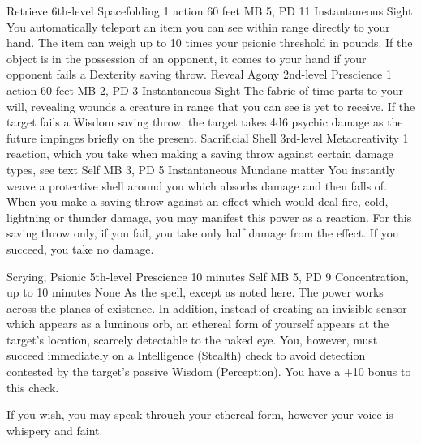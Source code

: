 \DndPowerHeader%
    {Retrieve\label{pwr:retrieve}}
    {6th-level Spacefolding}
    {1 action}
    {60 feet}
    {MB 5, PD 11}
    {Instantaneous}
    {Sight}
You automatically teleport an item you can
see within range directly to your hand. The item can weigh
up to 10 times your psionic threshold in pounds. If the object
is in the possession of an opponent, it comes to your hand
if your opponent fails a Dexterity saving throw.
\DndPowerHeader%
    {Reveal Agony\label{pwr:reveal_agony}}
    {2nd-level Prescience}
    {1 action}
    {60 feet}
    {MB 2, PD 3}
    {Instantaneous}
    {Sight}
The fabric of time parts to your will, revealing
wounds a creature in range that you can see
is yet to receive. If the target
fails a Wisdom saving throw, the target takes 4d6 psychic
damage as the future impinges briefly on the present.
\DndPowerHeader%
    {Sacrificial Shell\label{pwr:sacrificial_shell}}
    {3rd-level Metacreativity}
    {1 reaction, which you take when making a saving throw against certain damage types, see text}
    {Self}
    {MB 3, PD 5}
    {Instantaneous}
    {Mundane matter}
You instantly weave a protective shell around
you which absorbs damage and then falls of. When you make
a saving throw against an effect which would deal fire, cold,
lightning or thunder damage, you may manifest this power as
a reaction. For this saving throw only, if you fail, you take
only half damage from the effect. If you succeed, you take
no damage.

\DndPowerHeader%
    {Scrying, Psionic\label{pwr:scrying_psionic}}
    {5th-level Prescience}
    {10 minutes}
    {Self}
    {MB 5, PD 9}
    {Concentration, up to 10 minutes}
    {None}
As the  spell, except as noted
here. The power works across the planes of existence. In addition,
instead of creating an invisible sensor which appears as a
luminous orb, an ethereal form of yourself appears at the
target's location, scarcely detectable to the naked eye.
You, however, must succeed immediately on a Intelligence (Stealth)
check to avoid detection contested by the target's passive
Wisdom (Perception). You have a +10 bonus to this check.

If you wish, you may speak through your ethereal form, however
your voice is whispery and faint.


